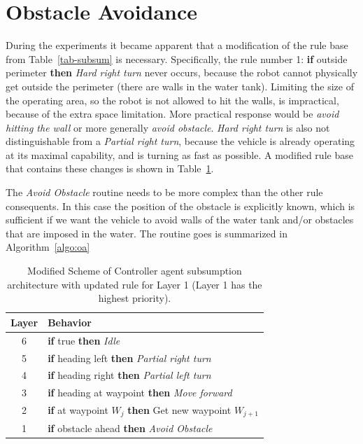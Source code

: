 \newpage

\section{Obstacle Avoidance}
\label{sec:obstacle-avoidance}
During the experiments it became apparent that a modification of the rule base from Table~\ref{tab-subsum} is necessary. Specifically, the rule number 1: \textbf{if} outside perimeter \textbf{then} \textit{Hard right turn} never occurs, because the robot cannot physically get outside the perimeter (there are walls in the water tank). Limiting the size of the operating area, so the robot is not allowed to hit the walls, is impractical, because of the extra space limitation. More practical response would be \textit{avoid hitting the wall} or more generally \textit{avoid obstacle}. \textit{Hard right turn} is also not distinguishable from a \textit{Partial right turn}, because the vehicle is already operating at its maximal capability, and is turning as fast as possible. A modified rule base that contains these changes is shown in Table~\ref{tab-subsum-modified}.


The \textit{Avoid Obstacle} routine needs to be more complex than the other rule consequents. In this case the position of the obstacle is explicitly known, which is sufficient if we want the vehicle to avoid walls of the water tank and/or obstacles that are imposed in the water. The routine goes is summarized in Algorithm~\ref{algo:oa}


\begin{table}
\centering
\renewcommand{\arraystretch}{1.7}
\begin{tabular}{>{\small}c>{\small}l}
\hline
Layer & Behavior\\
\hline
\rowcolor{Gray}
6 & \textbf{if} true \textbf{then} \textit{Idle} \\
5 & \textbf{if} heading left \textbf{then} \textit{Partial right turn}\\
\rowcolor{Gray}
4 & \textbf{if} heading right \textbf{then} \textit{Partial left turn}\\
3 & \textbf{if} heading at waypoint \textbf{then} \textit{Move forward}\\
\rowcolor{Gray}
2 & \textbf{if} at waypoint $W_j$ \textbf{then} Get new waypoint $W_{j+1}$\\
1 & \textbf{if} obstacle ahead \textbf{then} \textit{Avoid Obstacle}\\
\hline
\end{tabular}
\newline
\caption[Modified Controller agent subsumption architecture]{Modified Scheme of Controller agent subsumption architecture with updated rule for Layer 1 (Layer 1 has the highest priority).}
\label{tab-subsum-modified}
\end{table}



